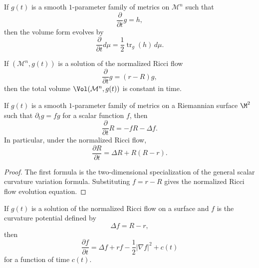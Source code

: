 \begin{corollary}
\label{ch05-cor-area-form-evolution}
If \(g(t)\) is a smooth \(1\)-parameter family of metrics on \(\mathcal{M}^n\) such that
\[
\frac{\partial}{\partial t}g = h,
\]
then the volume form evolves by
\[
\frac{\partial}{\partial t}d\mu = \frac12 \operatorname{tr}_g(h)\,d\mu.
\]
\end{corollary}

\begin{corollary}
\label{ch05-cor-area-preservation}
If \((\mathcal{M}^n,g(t))\) is a solution of the normalized Ricci flow
\[
\frac{\partial}{\partial t}g=(r-R)g,
\]
then the total volume \(\Vol(\mathcal M^n,g(t))\) is constant in time.
\end{corollary}

\begin{lemma}
\label{ch05-lem-scalar-curvature-evolution-surface}
If \(g(t)\) is a smooth \(1\)-parameter family of metrics on a Riemannian surface \(\M^2\) such that \(\partial_t g = f g\) for a scalar function \(f\), then
\[
\frac{\partial}{\partial t}R = -fR -\Delta f.
\]
In particular, under the normalized Ricci flow,
\[
\frac{\partial R}{\partial t}=\Delta R+R(R-r).
\]
\end{lemma}

\begin{proof}
\sketch The first formula is the two-dimensional specialization of the general scalar curvature variation formula. Substituting \(f=r-R\) gives the normalized Ricci flow evolution equation.
\end{proof}

\begin{corollary}
\label{ch05-cor-curvature-potential-evolution}
If \(g(t)\) is a solution of the normalized Ricci flow on a surface and \(f\) is the curvature potential defined by
\[
\Delta f = R-r,
\]
then
\[
\frac{\partial f}{\partial t}=\Delta f + r f - \frac12 |\nabla f|^2 + c(t)
\]
for a function of time \(c(t)\).
\end{corollary}

